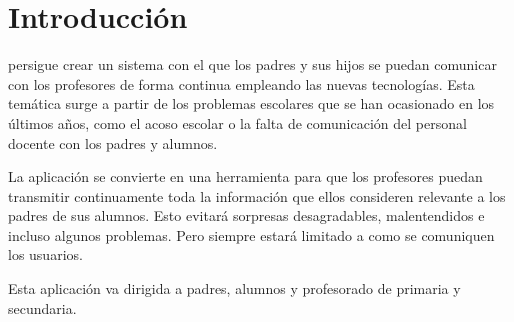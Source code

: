 %
%
%
%

\cleardoublepage
\chapter{Introducción}
\label{chap:intorduction}

	\CollegeApp persigue crear un sistema con el que los padres y sus hijos se puedan comunicar con los profesores de forma continua empleando las nuevas tecnologías. Esta temática surge a partir de los problemas escolares que se han ocasionado en los últimos años, como el acoso escolar o la falta de comunicación del personal docente con los padres y alumnos.
	
	\bigskip
	La aplicación se convierte en una herramienta para que los profesores puedan transmitir continuamente toda la información que ellos consideren relevante a los padres de sus alumnos. Esto evitará sorpresas desagradables, malentendidos e incluso algunos problemas.
	Pero siempre estará limitado a como se comuniquen los usuarios.
	
	\bigskip
	Esta aplicación va dirigida a padres, alumnos y profesorado de primaria y secundaria.